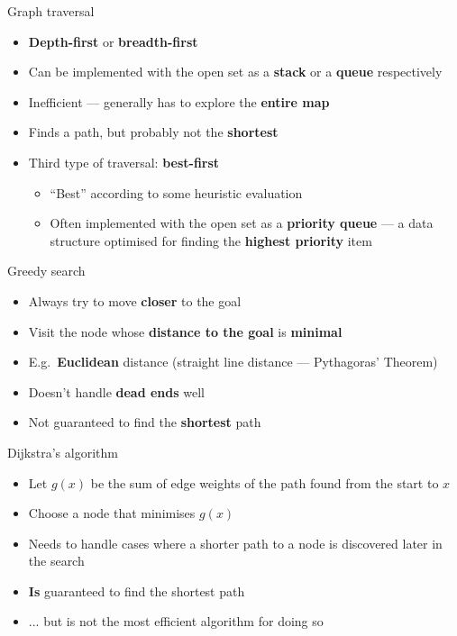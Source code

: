 \begin{frame}{Graph traversal}
	\begin{itemize}
		\pause\item \textbf{Depth-first} or \textbf{breadth-first}
		\pause\item Can be implemented with the open set as a \textbf{stack} or a \textbf{queue} respectively
		\pause\item Inefficient --- generally has to explore the \textbf{entire map}
		\pause\item Finds a path, but probably not the \textbf{shortest}
		\pause\item Third type of traversal: \textbf{best-first}
			\begin{itemize}
				\pause\item ``Best'' according to some heuristic evaluation
				\pause\item Often implemented with the open set as a \textbf{priority queue} ---
				    a data structure optimised for finding the \textbf{highest priority} item
			\end{itemize}
	\end{itemize}
\end{frame}

\begin{frame}{Greedy search}
	\begin{itemize}
		\pause\item Always try to move \textbf{closer} to the goal
		\pause\item Visit the node whose \textbf{distance to the goal} is \textbf{minimal}
		\pause\item E.g.\ \textbf{Euclidean} distance (straight line distance --- Pythagoras' Theorem)
		\pause\item Doesn't handle \textbf{dead ends} well
		\pause\item Not guaranteed to find the \textbf{shortest} path
	\end{itemize}
\end{frame}

\begin{frame}{Dijkstra's algorithm}
	\begin{itemize}
		\pause\item Let $g(x)$ be the sum of edge weights of the path found from the start to $x$
		\pause\item Choose a node that minimises $g(x)$
		\pause\item Needs to handle cases where a shorter path to a node is discovered later in the search
		\pause\item \textbf{Is} guaranteed to find the shortest path
		\pause\item ... but is not the most efficient algorithm for doing so
	\end{itemize}
\end{frame}

